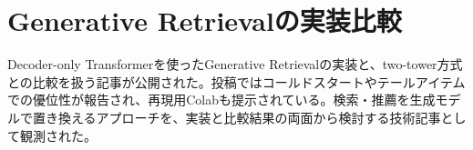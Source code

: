 \section{Generative Retrievalの実装比較}
Decoder-only Transformerを使ったGenerative Retrievalの実装と、two-tower方式との比較を扱う記事が公開された。投稿ではコールドスタートやテールアイテムでの優位性が報告され、再現用Colabも提示されている。検索・推薦を生成モデルで置き換えるアプローチを、実装と比較結果の両面から検討する技術記事として観測された。
